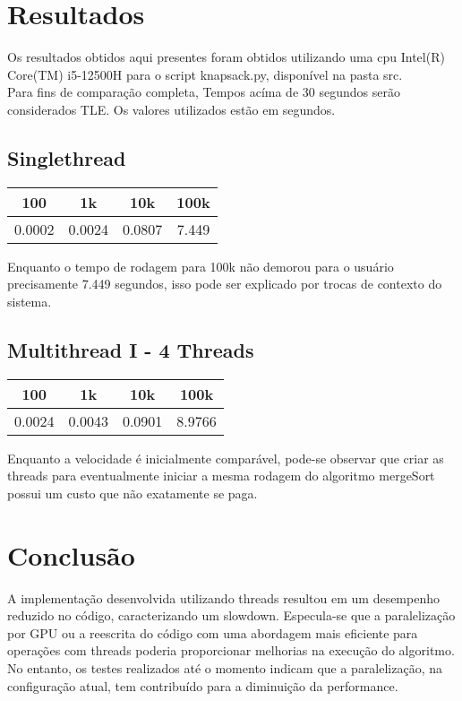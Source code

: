 \documentclass{article}
\begin{document}
\section{Resultados}
Os resultados obtidos aqui presentes foram obtidos utilizando uma cpu Intel(R) Core(TM) i5-12500H para o script knapsack.py, disponível na pasta src.\\
Para fins de comparação completa, 
Tempos acíma de 30 segundos serão considerados TLE. Os valores utilizados estão em segundos.\\
\subsection{Singlethread}
    
    \begin{center}
        \begin{tabular}{||c c c c||} 
         \hline
         100 & 1k & 10k & 100k \\ [0.5ex] 
         \hline\hline
         0.0002 & 0.0024 & 0.0807 & 7.449 \\
         \hline
        \end{tabular}
    \end{center}
Enquanto o tempo de rodagem para 100k não demorou para o usuário precisamente 7.449 segundos, isso pode ser explicado por trocas de contexto do sistema.

\subsection{Multithread I - 4 Threads}
    \begin{center}
        \begin{tabular}{||c c c c||} 
         \hline
         100 & 1k & 10k & 100k \\ [0.5ex] 
         \hline\hline
         0.0024 & 0.0043 & 0.0901 & 8.9766 \\
         \hline
        \end{tabular}
    \end{center}

Enquanto a velocidade é inicialmente comparável, pode-se observar que criar as threads para eventualmente iniciar a mesma rodagem do algoritmo mergeSort possui um custo que não exatamente se paga.\\

\section{Conclusão}

A implementação desenvolvida utilizando threads resultou em um desempenho reduzido no código, caracterizando um slowdown. Especula-se que a paralelização por GPU ou a reescrita do código com uma abordagem mais eficiente para operações com threads poderia proporcionar melhorias na execução do algoritmo. No entanto, os testes realizados até o momento indicam que a paralelização, na configuração atual, tem contribuído para a diminuição da performance.
\end{document}
